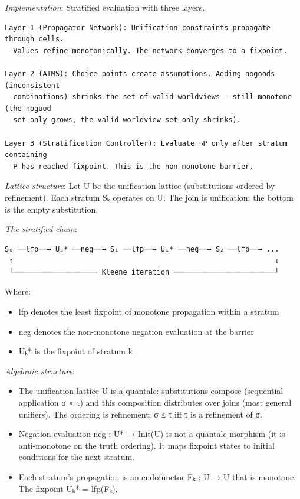 \documentclass[11pt]{article}
\begin{document}
\emph{Implementation}: Stratified evaluation with three layers.

\begin{verbatim}
Layer 1 (Propagator Network): Unification constraints propagate through cells.
  Values refine monotonically. The network converges to a fixpoint.

Layer 2 (ATMS): Choice points create assumptions. Adding nogoods (inconsistent
  combinations) shrinks the set of valid worldviews — still monotone (the nogood
  set only grows, the valid worldview set only shrinks).

Layer 3 (Stratification Controller): Evaluate ¬P only after stratum containing
  P has reached fixpoint. This is the non-monotone barrier.
\end{verbatim}

\emph{Lattice structure}: Let U be the unification lattice (substitutions ordered by
refinement). Each stratum Sₖ operates on U. The join is unification; the bottom
is the empty substitution.

\emph{The stratified chain}:

\begin{verbatim}
S₀ ──lfp──→ U₀* ──neg──→ S₁ ──lfp──→ U₁* ──neg──→ S₂ ──lfp──→ ...
 ↑                                                              ↓
 └──────────────────── Kleene iteration ────────────────────────┘
\end{verbatim}

Where:
\begin{itemize}
\item lfp denotes the least fixpoint of monotone propagation within a stratum
\item neg denotes the non-monotone negation evaluation at the barrier
\item Uₖ* is the fixpoint of stratum k
\end{itemize}

\emph{Algebraic structure}:
\begin{itemize}
\item The unification lattice U is a quantale: substitutions compose (sequential
application σ ∘ τ) and this composition distributes over joins (most general
unifiers). The ordering is refinement: σ ≤ τ iff τ is a refinement of σ.
\item Negation evaluation neg : U* → Init(U) is not a quantale morphism (it is
anti-monotone on the truth ordering). It maps fixpoint states to initial
conditions for the next stratum.
\item Each stratum's propagation is an endofunctor Fₖ : U → U that is monotone.
The fixpoint Uₖ* = lfp(Fₖ).
\end{itemize}
\end{document}
